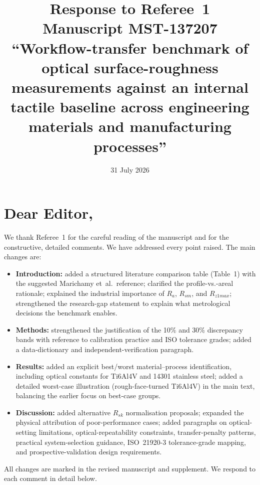 \documentclass[10pt]{article}
\begin{document}
\title{Response to Referee~1 \\
Manuscript MST-137207 \\
{\normalsize ``Workflow-transfer benchmark of optical surface-roughness measurements against an internal tactile baseline across engineering materials and manufacturing processes''}}

\date{31 July 2026}
\maketitle

\section*{Dear Editor,}

We thank Referee~1 for the careful reading of the manuscript and for the constructive, detailed comments. We have addressed every point raised. The main changes are:

\begin{itemize}
    \item \textbf{Introduction:} added a structured literature comparison table (Table~1) with the suggested Marichamy et~al.\ reference; clarified the profile-vs.-areal rationale; explained the industrial importance of $R_a$, $R_{sm}$, and $R_{z1max}$; strengthened the research-gap statement to explain what metrological decisions the benchmark enables.
    \item \textbf{Methods:} strengthened the justification of the 10\% and 30\% discrepancy bands with reference to calibration practice and ISO tolerance grades; added a data-dictionary and independent-verification paragraph.
    \item \textbf{Results:} added an explicit best/worst material--process identification, including optical constants for Ti6Al4V and 14301 stainless steel; added a detailed worst-case illustration (rough-face-turned Ti6Al4V) in the main text, balancing the earlier focus on best-case groups.
    \item \textbf{Discussion:} added alternative $R_{sk}$ normalisation proposals; expanded the physical attribution of poor-performance cases; added paragraphs on optical-setting limitations, optical-repeatability constraints, transfer-penalty patterns, practical system-selection guidance, ISO~21920-3 tolerance-grade mapping, and prospective-validation design requirements.
\end{itemize}

All changes are marked in the revised manuscript and supplement. We respond to each comment in detail below.
\end{document}
